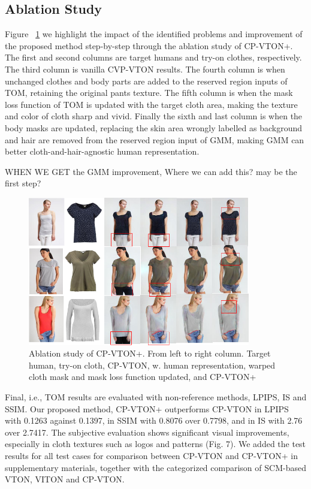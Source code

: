 \subsection{Ablation Study}

Figure ~\ref{fig:ablation} we highlight the impact of the identified problems and improvement of the proposed method step-by-step through the ablation study of CP-VTON+. The first and second columns are target humans and try-on clothes, respectively. The third column is vanilla CVP-VTON results. The fourth column is when unchanged clothes and body parts are added to the reserved region inputs of TOM, retaining the original pants texture. The fifth column is when the mask loss function of TOM is updated with the target cloth area, making the texture and color of cloth sharp and vivid. Finally the sixth and last column is when the body masks are updated, replacing the skin area wrongly labelled as background and hair are removed from the reserved region input of GMM, making GMM can better cloth-and-hair-agnostic human representation.  

WHEN WE GET the GMM improvement, Where we can add this? may be the first step?

\begin{figure}
\centering
\includegraphics[height=6.5cm, scale=1]{figures/ablation.png} 
\caption{Ablation study of CP-VTON+. From left to right column. Target human, try-on cloth, CP-VTON, w. human representation, warped cloth mask and mask loss function updated, and CP-VTON+
}
\label{fig:ablation}
\end{figure}


Final, i.e., TOM results are evaluated with non-reference methods, LPIPS, IS and SSIM. Our proposed method, CP-VTON+ outperforms CP-VTON in LPIPS with 0.1263 against 0.1397, in SSIM with 0.8076 over 0.7798, and in IS with 2.76 over 2.7417. The subjective evaluation shows significant visual improvements, especially in cloth textures such as logos and patterns (Fig. 7). We added the test results for all test cases for comparison between CP-VTON and CP-VTON+ in supplementary materials, together with the categorized comparison of SCM-based VTON, VITON and CP-VTON.


